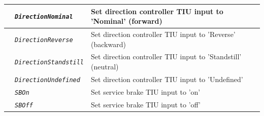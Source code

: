 \documentclass{template/openetcs}
\begin{document}
\begin{itemize}
\begin{longtable}{|l|l|l|}
			\hline
			
			&	\begin{minipage}[t]{0.40\linewidth} \emph{\texttt{DirectionNominal}} \end{minipage}
			&	\begin{minipage}[t]{0.38\linewidth} Set direction controller TIU input to ’Nominal’ (forward) \end{minipage} \\
			
			\hline
			
			&	\begin{minipage}[t]{0.40\linewidth} \emph{\texttt{DirectionReverse}} \end{minipage}
			&	\begin{minipage}[t]{0.38\linewidth} Set direction controller TIU input to ’Reverse’ (backward) \end{minipage} \\
			
			\hline
			
			&	\begin{minipage}[t]{0.40\linewidth} \emph{\texttt{DirectionStandstill}} \end{minipage}
			&	\begin{minipage}[t]{0.38\linewidth} Set direction controller TIU input to ’Standstill’ (neutral) \end{minipage} \\
			
			\hline
			
			&	\begin{minipage}[t]{0.40\linewidth} \emph{\texttt{DirectionUndefined}} \end{minipage}
			&	\begin{minipage}[t]{0.38\linewidth} Set direction controller TIU input to ’Undefined’ \end{minipage} \\
			
			\hline
			
			&	\begin{minipage}[t]{0.40\linewidth} \emph{\texttt{SBOn}} \end{minipage}
			&	\begin{minipage}[t]{0.38\linewidth} Set service brake TIU input to ’on’ \end{minipage} \\
			
			\hline
			
			&	\begin{minipage}[t]{0.40\linewidth} \emph{\texttt{SBOff}} \end{minipage}
			&	\begin{minipage}[t]{0.38\linewidth} Set service brake TIU input to ’off’ \end{minipage} \\
			

\end{longtable}
\end{itemize}
\end{document}
